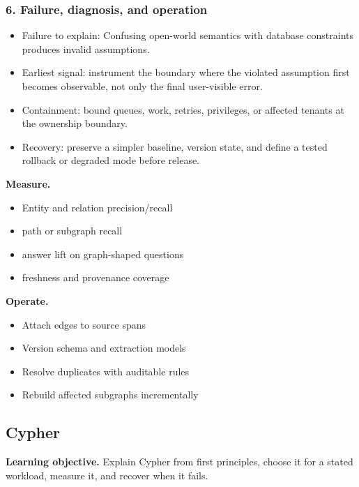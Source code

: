 \subsubsection*{6. Failure, diagnosis, and operation}
\begin{itemize}
\item Failure to explain: Confusing open-world semantics with database constraints produces invalid assumptions.
\item Earliest signal: instrument the boundary where the violated assumption first becomes observable, not only the final user-visible error.
\item Containment: bound queues, work, retries, privileges, or affected tenants at the ownership boundary.
\item Recovery: preserve a simpler baseline, version state, and define a tested rollback or degraded mode before release.
\end{itemize}
\textbf{Measure.}\begin{itemize}
\item Entity and relation precision/recall
\item path or subgraph recall
\item answer lift on graph-shaped questions
\item freshness and provenance coverage
\end{itemize}
\textbf{Operate.}\begin{itemize}
\item Attach edges to source spans
\item Version schema and extraction models
\item Resolve duplicates with auditable rules
\item Rebuild affected subgraphs incrementally
\end{itemize}
\subsection{Cypher}
\textbf{Learning objective.} Explain Cypher from first principles, choose it for a stated workload, measure it, and recover when it fails.
